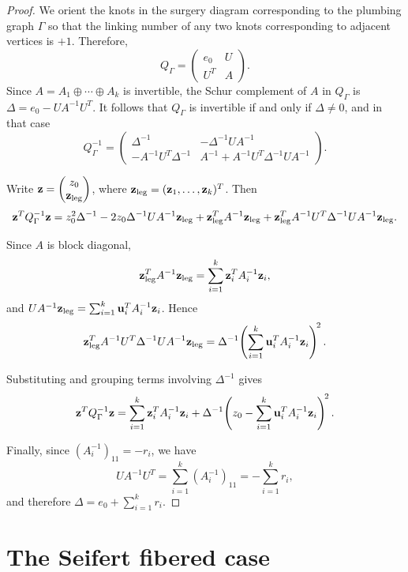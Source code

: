 \documentclass[11pt]{amsart}
\theoremstyle{plain}
\theoremstyle{definition}
\theoremstyle{remark}
\begin{document}
\begin{proof}
We orient the knots in the surgery diagram corresponding to the
plumbing graph $\Gamma$ so that the linking number of any two knots
corresponding to adjacent vertices is $+1$. Therefore,
\[
Q_\Gamma=
\begin{pmatrix}
e_0 & U\\
U^T & A
\end{pmatrix}.
\]
Since $A=A_1\oplus\cdots\oplus A_k$ is invertible, the Schur
complement of $A$ in $Q_\Gamma$ is $\Delta=e_0-UA^{-1}U^T$. It follows
that $Q_\Gamma$ is invertible if and only if $\Delta\neq 0$, and in
that case
\[
Q^{-1}_\Gamma=
\begin{pmatrix}
\Delta^{-1} & -\Delta^{-1}UA^{-1}\\
-A^{-1}U^T\Delta^{-1} & A^{-1}+A^{-1}U^T\Delta^{-1}UA^{-1}
\end{pmatrix}.
\]

Write $\mathbf z=\begin{pmatrix}z_0\\\mathbf z_{\rm leg}\end{pmatrix}$,
where $\mathbf z_{\rm leg}=(\mathbf z_1,\dots,\mathbf z_k)^T$. Then
\[
\mathbf z^TQ_\Gamma^{-1}\mathbf z
=
z_0^2\Delta^{-1}
-2z_0\Delta^{-1}UA^{-1}\mathbf z_{\rm leg}
+\mathbf z_{\rm leg}^TA^{-1}\mathbf z_{\rm leg}
+\mathbf z_{\rm leg}^TA^{-1}U^T\Delta^{-1}UA^{-1}\mathbf z_{\rm leg}.
\]

Since $A$ is block diagonal,
\[
\mathbf z_{\rm leg}^TA^{-1}\mathbf z_{\rm leg}
=
\sum_{i=1}^k \mathbf z_i^TA_i^{-1}\mathbf z_i,
\]
and
$UA^{-1}\mathbf z_{\rm leg}=\sum_{i=1}^k {\bf u}_i^TA_i^{-1}\mathbf z_i$.
Hence
\[
\mathbf z_{\rm leg}^TA^{-1}U^T\Delta^{-1}UA^{-1}\mathbf z_{\rm leg}
=
\Delta^{-1}\!\left(\sum_{i=1}^k {\bf u}_i^TA_i^{-1}\mathbf z_i\right)^{\!2}.
\]

Substituting and grouping terms involving $\Delta^{-1}$ gives
\[
\mathbf z^TQ_\Gamma^{-1}\mathbf z
=
\sum_{i=1}^k \mathbf z_i^TA_i^{-1}\mathbf z_i
+
\Delta^{-1}\!\left(z_0-\sum_{i=1}^k {\bf u}_i^TA_i^{-1}\mathbf z_i\right)^{\!2}.
\]

Finally, since $(A_i^{-1})_{11}=-r_i$, we have
\[
UA^{-1}U^T=\sum_{i=1}^k (A_i^{-1})_{11}=-\sum_{i=1}^k r_i,
\]
and therefore $\Delta=e_0+\sum_{i=1}^k r_i$.
\end{proof}

\section{The Seifert fibered case}\label{sec:theta}
\end{document}
